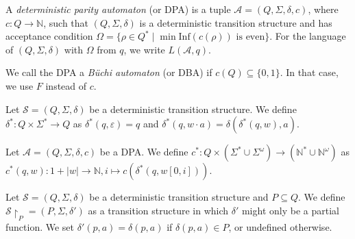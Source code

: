 \begin{defn}
	A \emph{deterministic parity automaton} (or DPA) is a tuple $\mathcal{A} = (Q, \Sigma, \delta, c)$, where $c : Q \rightarrow \mathbb{N}$, such that $(Q, \Sigma, \delta)$ is a deterministic transition structure and has acceptance condition $\Omega = \{ \rho \in Q^* \mid \min \text{Inf}(c(\rho)) \text{ is even} \}$. For the language of $(Q, \Sigma, \delta)$ with $\Omega$ from $q$, we write $L(\mathcal{A}, q)$.
	
	We call the DPA a \emph{B\"uchi automaton} (or DBA) if $c(Q) \subseteq \{0, 1\}$. In that case, we use $F$ instead of $c$.
\end{defn}

\begin{defn}
	Let $\mathcal{S} = (Q, \Sigma, \delta)$ be a deterministic transition structure. We define $\delta^* : Q \times \Sigma^* \rightarrow Q$ as $\delta^*(q, \varepsilon) = q$ and $\delta^*(q, w \cdot a) = \delta(\delta^*(q, w), a)$.
\end{defn}

\begin{defn}
	Let $\mathcal{A} = (Q, \Sigma, \delta, c)$ be a DPA. We define $c^* : Q \times (\Sigma^* \cup \Sigma^\omega) \rightarrow (\mathbb{N}^* \cup \mathbb{N}^\omega)$ as $c^*(q, w) : 1+|w| \rightarrow \mathbb{N}, i \mapsto c(\delta^*(q, w[0, i]))$.
\end{defn}

\begin{defn}
	Let $\mathcal{S} = (Q, \Sigma, \delta)$ be a deterministic transition structure and $P \subseteq Q$. We define $\mathcal{S} \upharpoonright_P = (P, \Sigma, \delta')$ as a transition structure in which $\delta'$ might only be a partial function. We set $\delta'(p, a) = \delta(p, a)$ if $\delta(p, a) \in P$, or undefined otherwise.
\end{defn}


